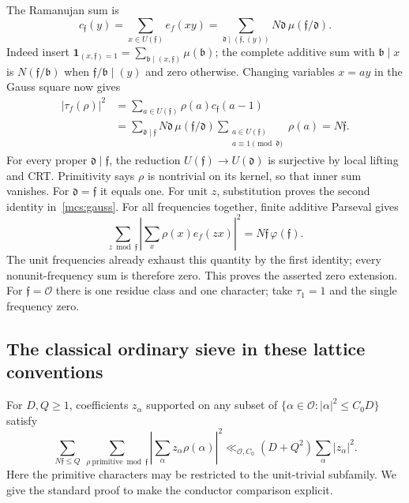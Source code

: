 \documentclass[11pt]{article}
\theoremstyle{definition}\newtheorem{definition}[theorem]{Definition}
\theoremstyle{remark}\newtheorem{remark}[theorem]{Remark}
\begin{document}
The Ramanujan sum is
\[
 c_{\mathfrak f}(y)=\sum_{x\in U(\mathfrak f)}e_f(xy)
   =\sum_{\mathfrak d\mid(\mathfrak f,(y))}
                   N\mathfrak d\,\mu(\mathfrak f/\mathfrak d).
\]
Indeed insert $\mathbf1_{(x,\mathfrak f)=1}
=\sum_{\mathfrak b\mid(x,\mathfrak f)}\mu(\mathfrak b)$;
the complete additive sum with $\mathfrak b\mid x$ is
$N(\mathfrak f/\mathfrak b)$ when
$\mathfrak f/\mathfrak b\mid(y)$ and zero otherwise.
Changing variables $x=ay$ in the Gauss square now gives
\begin{align*}
 |\tau_f(\rho)|^2
 &=\sum_{a\in U(\mathfrak f)}\rho(a)c_{\mathfrak f}(a-1)\\
 &=\sum_{\mathfrak d\mid\mathfrak f}N\mathfrak d\,
       \mu(\mathfrak f/\mathfrak d)
       \sum_{\substack{a\in U(\mathfrak f)\\a\equiv1\pmod{\mathfrak d}}}
                  \rho(a)=N\mathfrak f.
\end{align*}
For every proper $\mathfrak d\mid\mathfrak f$, the reduction
$U(\mathfrak f)\to U(\mathfrak d)$ is surjective by local lifting and CRT.
Primitivity says $\rho$ is nontrivial on its kernel, so that inner sum
vanishes. For $\mathfrak d=\mathfrak f$ it equals one.
For unit $z$, substitution proves the second identity in~\eqref{mcs:gauss}.
For all frequencies together, finite additive Parseval gives
\[
 \sum_{z\bmod\mathfrak f}
   \left|\sum_x\rho(x)e_f(zx)\right|^2
       =N\mathfrak f\,\varphi(\mathfrak f).
\]
The unit frequencies already exhaust this quantity by the first identity;
every nonunit-frequency sum is therefore zero. This proves the asserted
zero extension. For $\mathfrak f=\mathcal O$ there is one residue class
and one character; take $\tau_1=1$ and the single frequency zero.

\subsection{The classical ordinary sieve in these lattice conventions}
For $D,Q\ge1$, coefficients $z_\alpha$ supported on any subset of
$\{\alpha\in\mathcal O:|\alpha|^2\le C_0D\}$ satisfy
\begin{equation}\label{mcs:ordinary}
 \sum_{N\mathfrak f\le Q}\ \sum_{\rho\ \mathrm{primitive}\bmod\mathfrak f}
 \left|\sum_\alpha z_\alpha\rho(\alpha)\right|^2
 \ll_{\mathcal O,C_0}(D+Q^2)\sum_\alpha|z_\alpha|^2.
\end{equation}
Here the primitive characters may be restricted to the unit-trivial
subfamily. We give the standard proof to make the conductor comparison
explicit.
\end{document}
